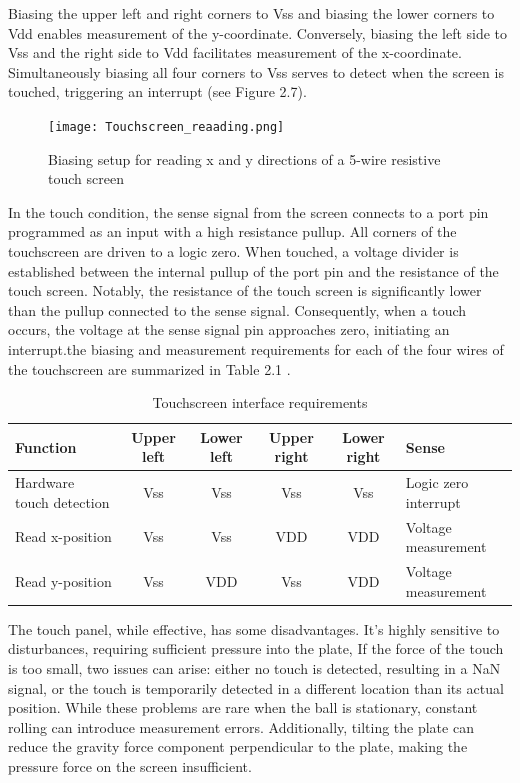 Biasing the upper left and right corners to Vss and biasing the lower corners to Vdd enables measurement of the y-coordinate. Conversely, biasing the left side to Vss and the right side to Vdd facilitates measurement of the x-coordinate. Simultaneously biasing all four corners to Vss serves to detect when the screen is touched, triggering an interrupt (see Figure 2.7).
\begin{figure}[h]
    \centering
    \texttt{[image: Touchscreen\_reaading.png]}
    \caption{ Biasing setup for reading x and y directions of a 5-wire resistive touch screen}
    \label{fig:enter-label}
\end{figure}
In the touch condition, the sense signal from the screen connects to a port pin programmed as an input with a high resistance pullup. All corners of the touchscreen are driven to a logic zero. When touched, a voltage divider is established between the internal pullup of the port pin and the resistance of the touch screen. Notably, the resistance of the touch screen is significantly lower than the pullup connected to the sense signal. Consequently, when a touch occurs, the voltage at the sense signal pin approaches zero, initiating an interrupt.the biasing and measurement requirements for each of the four wires of the touchscreen are summarized in Table 2.1 .
\begin{table}[h]
\centering
\caption{Touchscreen interface requirements}
\label{tab:touchscreen_requirements}
\begin{tabular}{|p{2.5cm}|c|c|c|c|p{2cm}|}
\hline
\textbf{Function} & \textbf{Upper left} & \textbf{Lower left} & \textbf{Upper right} & \textbf{Lower right} & \textbf{Sense} \\ \hline
Hardware touch detection & Vss & Vss & Vss & Vss & Logic zero interrupt \\ \hline
Read x-position & Vss & Vss & V\tiny{DD} & V\tiny{DD} & Voltage measurement \\ \hline
Read y-position & Vss & V\tiny{DD} & Vss & V\tiny{DD} & Voltage measurement \\ \hline
\end{tabular}
\end{table}

The touch panel, while effective, has some disadvantages. It's highly sensitive to disturbances, requiring sufficient pressure into the plate, If the force of the touch is too small, two issues can arise: either no touch is detected, resulting in a NaN signal, or the touch is temporarily detected in a different location than its actual position. While these problems are rare when the ball is stationary, constant rolling can introduce measurement errors. Additionally, tilting the plate can reduce the gravity force component perpendicular to the plate, making the pressure force on the screen insufficient.


